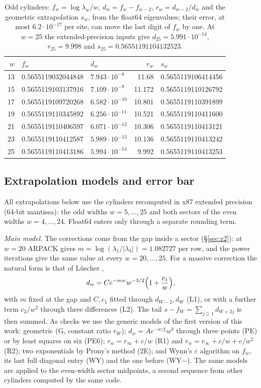\documentclass[11pt]{amsart}
\theoremstyle{definition}
\theoremstyle{remark}
\begin{document}
\begin{table}[ht]
\caption{Odd cylinders: $f_w = \log\lambda_w / w$, $d_w = f_w - f_{w-2}$, $r_w = d_{w-2}/d_w$ and the
geometric extrapolation $s_w$, from the float64 eigenvalues; their error, at most $6.2\cdot10^{-17}$
per site, can move the last digit of $f_w$ by one. At $w = 25$ the extended-precision inputs give
$d_{25} = 5.991\cdot10^{-14}$, $r_{25} = 9.998$ and $s_{25} = 0.56551191104132523$.}\label{tab:odd}
\begin{tabular}{rllrl}
\toprule
$w$ & $f_w$ & $d_w$ & $r_w$ & $s_w$ \\
\midrule
13 & 0.5655119032044848 & $7.943\cdot10^{-8}$  & 11.68 & 0.5655119106414456 \\
15 & 0.5655119103137916 & $7.109\cdot10^{-9}$  & 11.172 & 0.5655119110126792 \\
17 & 0.5655119109720268 & $6.582\cdot10^{-10}$ & 10.801 & 0.5655119110391899 \\
19 & 0.5655119110345892 & $6.256\cdot10^{-11}$ & 10.521 & 0.5655119110411600 \\
21 & 0.5655119110406597 & $6.071\cdot10^{-12}$ & 10.306 & 0.5655119110413121 \\
23 & 0.5655119110412587 & $5.989\cdot10^{-13}$ & 10.136 & 0.5655119110413242 \\
25 & 0.5655119110413186 & $5.994\cdot10^{-14}$ &  9.992 & 0.5655119110413253 \\
\bottomrule
\end{tabular}
\end{table}

\subsection{Extrapolation models and error bar}
All extrapolations below use the cylinders recomputed in x87 extended precision (64-bit mantissa):
the odd widths $w = 5, \dots, 25$ and both sectors of the even widths $w = 4, \dots, 24$. Float64
enters only through a separate rounding term.

\emph{Main model.} The corrections come from the gap inside a sector (\S\ref{sec:z2}): at $w = 20$
ARPACK gives $m = \log(\lambda_1/|\lambda_3|) = 1.082727$ per row, and the power iterations give the
same value at every $w = 20, \dots, 25$. For a massive correction the natural form is that of
L\"uscher \cite{luscher1986},
\[
  d_w = C e^{-mw} w^{-3/2} \Bigl(1 + \frac{c_1}{w}\Bigr),
\]
with $m$ fixed at the gap and $C, c_1$ fitted through $d_{W-2}, d_W$ (L1), or with a further term
$c_2/w^2$ through three differences (L2). The tail $s - f_W = \sum_{j \ge 1} d_{W+2j}$ is then
summed. As checks we use the generic models of the first version of this work: geometric (G,
constant ratio $r_W$); $d_w = A e^{-w/\xi} w^b$ through three points (PE) or by least squares on
six (PE6); $r_w = r_\infty + c/w$ (R1) and $r_w = r_\infty + c/w + e/w^2$ (R2); two exponentials
by Prony's method (2E); and Wynn's $\varepsilon$ algorithm \cite{wynn1956} on $f_w$, its last
full diagonal entry (WY) and the one before (WY$-$). The same models are applied to the even-width
sector midpoints, a second sequence from other cylinders computed by the same code.
\end{document}
